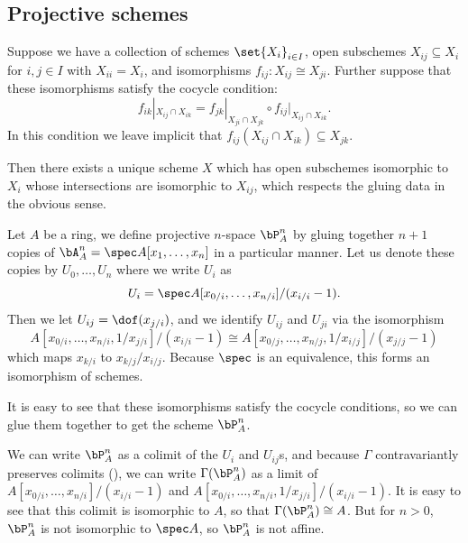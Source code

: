 \subsection{Projective schemes}

\blemm

    Suppose we have a collection of schemes $\set{X_i}_{i\in I}$, open subschemes $X_{ij}\subseteq X_i$ for $i,j\in I$
    with $X_{ii}=X_i$, and isomorphisms $f_{ij}\colon X_{ij}\cong X_{ji}$.
    Further suppose that these isomorphisms satisfy the {\emphcolor cocycle condition}:
    $$ f_{ik}|_{X_{ij}\cap X_{ik}} = f_{jk}|_{X_{ji}\cap X_{jk}}\circ f_{ij}|_{X_{ij}\cap X_{ik}} . $$
    In this condition we leave implicit that $f_{ij}(X_{ij}\cap X_{ik})\subseteq X_{jk}$.

    Then there exists a unique scheme $X$ which has open subschemes isomorphic to $X_i$ whose intersections are isomorphic
    to $X_{ij}$, which respects the gluing data in the obvious sense.

\elemm

\bproof


\eproof

\bexam[title={Projective space}]

    Let $A$ be a ring, we define {\emphcolor projective $n$-space} $\bP^n_A$ by gluing together $n+1$ copies of
    $\bA^n_A=\spec A[x_1,\dots,x_n]$ in a particular manner.
    Let us denote these copies by $U_0,\dots,U_n$ where we write $U_i$ as
    $$ U_i = \spec A[x_{0/i},\dots,x_{n/i}]/(x_{i/i}-1) . $$
    Then we let $U_{ij}=\dof(x_{j/i})$, and we identify $U_{ij}$ and $U_{ji}$ via the isomorphism
    $$ A[x_{0/i},\dots,x_{n/i},1/x_{j/i}]/(x_{i/i}-1) \cong A[x_{0/j},\dots,x_{n/j},1/x_{i/j}]/(x_{j/j}-1) $$
    which maps $x_{k/i}$ to $x_{k/j}/x_{i/j}$.
    Because $\spec$ is an equivalence, this forms an isomorphism of schemes.

    It is easy to see that these isomorphisms satisfy the cocycle conditions, so we can glue them together to get
    the scheme $\bP^n_A$.

    We can write $\bP^n_A$ as a colimit of the $U_i$ and $U_{ij}$s, and because $\Gamma$ contravariantly preserves colimits
    (), we can write $\Gamma(\bP^n_A)$ as a limit of $A[x_{0/i},\dots,x_{n/i}]/(x_{i/i}-1)$
    and $A[x_{0/i},\dots,x_{n/i},1/x_{j/i}]/(x_{i/i}-1)$.
    It is easy to see that this colimit is isomorphic to $A$, so that $\Gamma(\bP^n_A)\cong A$.
    But for $n>0$, $\bP^n_A$ is not isomorphic to $\spec A$, so $\bP^n_A$ is not affine.

